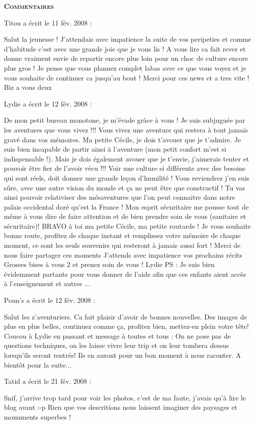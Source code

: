\bigskip
\textbf{\textsc{Commentaires}}

\medskip
Titou a écrit le 11 fév. 2008 :
\begin{displayquote}
Salut la jeunesse ! J'attendais avec impatience la suite de vos peripeties et comme d'habitude c'est avec une grande joie que je vous lis ! A vous lire ca fait rever et donne vraiment envie de repartir encore plus loin pour un choc de culture encore plus gros ! Je pense que vous plannez complet labas avec ce que vous voyez et je vous souhaite de continuer ca jusqu'au bout ! Merci pour ces news et a tres vite ! Biz a vous deux
\end{displayquote}

\medskip
Lydie a écrit le 12 fév. 2008 :
\begin{displayquote}
De mon petit bureau monotone, je m'évade grâce à vous !	
Je suis subjuguée par les aventures que vous vivez !!!
Vous vivez une aventure qui restera à tout jamais gravé dans vos mémoires.
Ma petite Cécile, je dois t'avouer que je t'admire. Je suis bien incapable de partir ainsi à l'aventure (mon petit confort m'est si indispensable !).
Mais je dois également avouer que je t'envie, j'aimerais tenter et pouvoir être fier de l'avoir vécu !!!
Voir une culture si différente avec des besoins qui sont réels, doit donner une grande leçon d'humilité !
Vous reviendrez j'en suis sûre, avec une autre vision du monde et ça ne peut être que constructif !
Tu vas ainsi pouvoir relativiser des mésaventures que l'on peut connaitre dans notre palais occidental doré qu'est la France !
Mon esprit sécuritaire me pousse tout de même à vous dire de faire attention et de bien prendre soin de vous (sanitaire et sécuritaire)!
BRAVO à toi ma petite Cécile, ma petite routarde !
Je vous souhaite bonne route, profitez de chaque instant et remplissez votre mémoire de chaque moment, ce sont les seuls souvenirs qui resteront à jamais aussi fort !
Merci de nous faire partager ces moments
J'attends avec impatience vos prochains récits
Grosses bises à vous 2 et prenez soin de vous !
Lydie
PS : Je suis bien évidemment partante pour vous donner de l'aide afin que ces enfants aient accès à l'enseignement et autres ...
\end{displayquote}

\medskip
Poun's a écrit le 12 fév. 2008 :
\begin{displayquote}
Salut les z'aventuriers. Ca fait plaisir d'avoir de bonnes nouvelles. Des images de plus en plus belles, continuez comme ça, profitez bien, mettez-en plein votre tête!
Coucou à Lydie en passant et message à toutes et tous :
On ne pose pas de questions techniques, on les laisse vivre leur trip et on leur tombera dessus lorsqu'ils seront rentrés! Ils en auront pour un bon moment à nous raconter.
A bientôt pour la suite...
\end{displayquote}

\medskip
Tatid a écrit le 21 fév. 2008 :
\begin{displayquote}
Snif, j'arrive trop tard pour voir les photos, c'est de ma faute, j'avais qu'à lire le blog avant :-p
Rien que vos descritions nous laissent imaginer des paysages et monuments superbes !
\end{displayquote}

